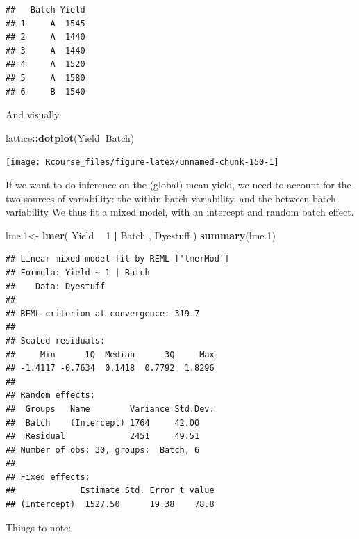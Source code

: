 \documentclass[]{book}
\newenvironment{Shaded}{\begin{snugshade}}{\end{snugshade}}
\newcommand{\KeywordTok}[1]{\textcolor[rgb]{0.13,0.29,0.53}{\textbf{#1}}}
\newcommand{\DecValTok}[1]{\textcolor[rgb]{0.00,0.00,0.81}{#1}}
\newcommand{\StringTok}[1]{\textcolor[rgb]{0.31,0.60,0.02}{#1}}
\newcommand{\OperatorTok}[1]{\textcolor[rgb]{0.81,0.36,0.00}{\textbf{#1}}}
\newcommand{\NormalTok}[1]{#1}
\theoremstyle{definition}
\theoremstyle{definition}
\theoremstyle{definition}
\theoremstyle{remark}
\begin{document}
\begin{verbatim}
##   Batch Yield
## 1     A  1545
## 2     A  1440
## 3     A  1440
## 4     A  1520
## 5     A  1580
## 6     B  1540
\end{verbatim}

And visually

\begin{Shaded}
\begin{Highlighting}[]
\NormalTok{lattice}\OperatorTok{::}\KeywordTok{dotplot}\NormalTok{(Yield}\OperatorTok{~}\NormalTok{Batch)}
\end{Highlighting}
\end{Shaded}

\texttt{[image: Rcourse\_files/figure-latex/unnamed-chunk-150-1]}

If we want to do inference on the (global) mean yield, we need to
account for the two sources of variability: the within-batch
variability, and the between-batch variability We thus fit a mixed
model, with an intercept and random batch effect.

\begin{Shaded}
\begin{Highlighting}[]
\NormalTok{lme.}\DecValTok{1}\NormalTok{<-}\StringTok{ }\KeywordTok{lmer}\NormalTok{( Yield }\OperatorTok{~}\StringTok{ }\DecValTok{1}  \OperatorTok{|}\StringTok{ }\NormalTok{Batch  , Dyestuff )}
\KeywordTok{summary}\NormalTok{(lme.}\DecValTok{1}\NormalTok{)}
\end{Highlighting}
\end{Shaded}

\begin{verbatim}
## Linear mixed model fit by REML ['lmerMod']
## Formula: Yield ~ 1 | Batch
##    Data: Dyestuff
## 
## REML criterion at convergence: 319.7
## 
## Scaled residuals: 
##     Min      1Q  Median      3Q     Max 
## -1.4117 -0.7634  0.1418  0.7792  1.8296 
## 
## Random effects:
##  Groups   Name        Variance Std.Dev.
##  Batch    (Intercept) 1764     42.00   
##  Residual             2451     49.51   
## Number of obs: 30, groups:  Batch, 6
## 
## Fixed effects:
##             Estimate Std. Error t value
## (Intercept)  1527.50      19.38    78.8
\end{verbatim}

Things to note:
\end{document}
